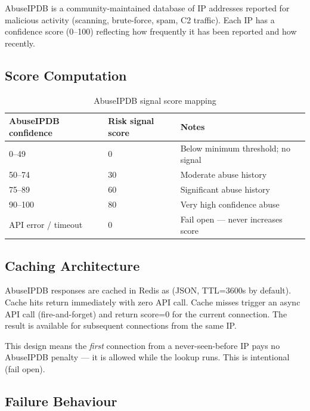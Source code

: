 AbuseIPDB is a community-maintained database of IP addresses reported for malicious
activity (scanning, brute-force, spam, C2 traffic). Each IP has a confidence score
(0–100) reflecting how frequently it has been reported and how recently.

\subsection{Score Computation}

\begin{fullwidth}
\begin{table}[h]
\caption{AbuseIPDB signal score mapping}
\label{tab:abuseipdb-scores}
\begin{tabular}{@{}llp{6.5cm}@{}}
\toprule
\textbf{AbuseIPDB confidence} & \textbf{Risk signal score} & \textbf{Notes} \\
\midrule
0–49 & 0 & Below minimum threshold; no signal \\
50–74 & 30 & Moderate abuse history \\
75–89 & 60 & Significant abuse history \\
90–100 & 80 & Very high confidence abuse \\
API error / timeout & 0 & Fail open — never increases score \\
\bottomrule
\end{tabular}
\end{table}
\end{fullwidth}

\subsection{Caching Architecture}

AbuseIPDB responses are cached in Redis as  (JSON, TTL=3600s by
default). Cache hits return immediately with zero API call. Cache misses trigger an
async API call (fire-and-forget) and return score=0 for the current connection. The
result is available for subsequent connections from the same IP.

This design means the \emph{first} connection from a never-seen-before IP pays no
AbuseIPDB penalty — it is allowed while the lookup runs. This is intentional (fail open).

\subsection{Failure Behaviour}

